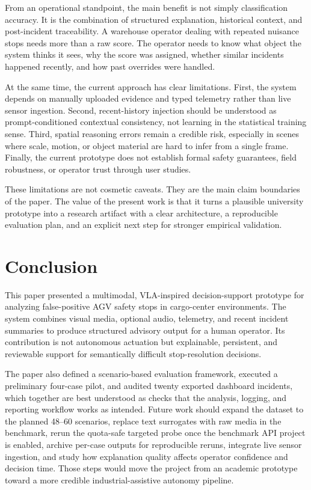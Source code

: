 \documentclass[conference]{IEEEtran}
\begin{document}
From an operational standpoint, the main benefit is not simply classification accuracy. It is the combination of structured explanation, historical context, and post-incident traceability. A warehouse operator dealing with repeated nuisance stops needs more than a raw score. The operator needs to know what object the system thinks it sees, why the score was assigned, whether similar incidents happened recently, and how past overrides were handled.

At the same time, the current approach has clear limitations. First, the system depends on manually uploaded evidence and typed telemetry rather than live sensor ingestion. Second, recent-history injection should be understood as prompt-conditioned contextual consistency, not learning in the statistical training sense. Third, spatial reasoning errors remain a credible risk, especially in scenes where scale, motion, or object material are hard to infer from a single frame. Finally, the current prototype does not establish formal safety guarantees, field robustness, or operator trust through user studies.

These limitations are not cosmetic caveats. They are the main claim boundaries of the paper. The value of the present work is that it turns a plausible university prototype into a research artifact with a clear architecture, a reproducible evaluation plan, and an explicit next step for stronger empirical validation.

\section{Conclusion}
This paper presented a multimodal, VLA-inspired decision-support prototype for analyzing false-positive AGV safety stops in cargo-center environments. The system combines visual media, optional audio, telemetry, and recent incident summaries to produce structured advisory output for a human operator. Its contribution is not autonomous actuation but explainable, persistent, and reviewable support for semantically difficult stop-resolution decisions.

The paper also defined a scenario-based evaluation framework, executed a preliminary four-case pilot, and audited twenty exported dashboard incidents, which together are best understood as checks that the analysis, logging, and reporting workflow works as intended. Future work should expand the dataset to the planned 48--60 scenarios, replace text surrogates with raw media in the benchmark, rerun the quota-safe targeted probe once the benchmark API project is enabled, archive per-case outputs for reproducible reruns, integrate live sensor ingestion, and study how explanation quality affects operator confidence and decision time. Those steps would move the project from an academic prototype toward a more credible industrial-assistive autonomy pipeline.
\end{document}
